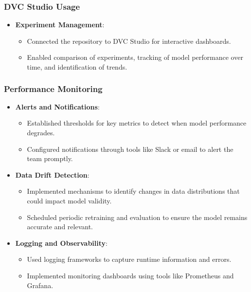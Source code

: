 \documentclass{article}
\begin{document}
\subsubsection{DVC Studio Usage}

\begin{itemize}[leftmargin=*]
    \item \textbf{Experiment Management}:
        \begin{itemize}[leftmargin=*]
            \item Connected the repository to DVC Studio for interactive dashboards.
            \item Enabled comparison of experiments, tracking of model performance over time, and identification of trends.
        \end{itemize}
\end{itemize}

\subsubsection{Performance Monitoring}

\begin{itemize}[leftmargin=*]
    \item \textbf{Alerts and Notifications}:
        \begin{itemize}[leftmargin=*]
            \item Established thresholds for key metrics to detect when model performance degrades.
            \item Configured notifications through tools like Slack or email to alert the team promptly.
        \end{itemize}
    \item \textbf{Data Drift Detection}:
        \begin{itemize}[leftmargin=*]
            \item Implemented mechanisms to identify changes in data distributions that could impact model validity.
            \item Scheduled periodic retraining and evaluation to ensure the model remains accurate and relevant.
        \end{itemize}
    \item \textbf{Logging and Observability}:
        \begin{itemize}[leftmargin=*]
            \item Used logging frameworks to capture runtime information and errors.
            \item Implemented monitoring dashboards using tools like Prometheus and Grafana.
        \end{itemize}
\end{itemize}
\end{document}
